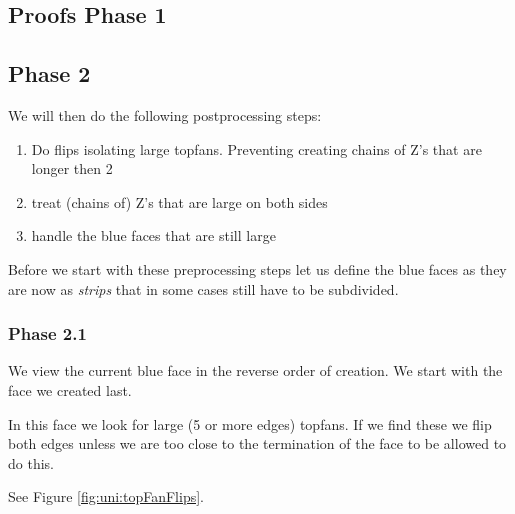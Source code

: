 \subsection{Proofs Phase 1}

\subsection{Phase 2}
We will then do the following postprocessing steps:

\begin{enumerate}
  \item Do flips isolating large topfans. Preventing creating chains of Z's that are longer then 2
  \item treat (chains of) Z's that are large on both sides
  \item handle the blue faces that are still large
\end{enumerate}

Before we start with these preprocessing steps let us define the blue faces as they are now as \emph{strips} that in some cases still have to be subdivided.

\subsubsection{Phase 2.1}
We view the current blue face in the reverse order of creation. We start with the face we created last.

In this face we look for large (5 or more edges) topfans. If we find these we flip both edges unless we are too close to the termination of the face to be allowed to do this.

See Figure \ref{fig:uni:topFanFlips}.


